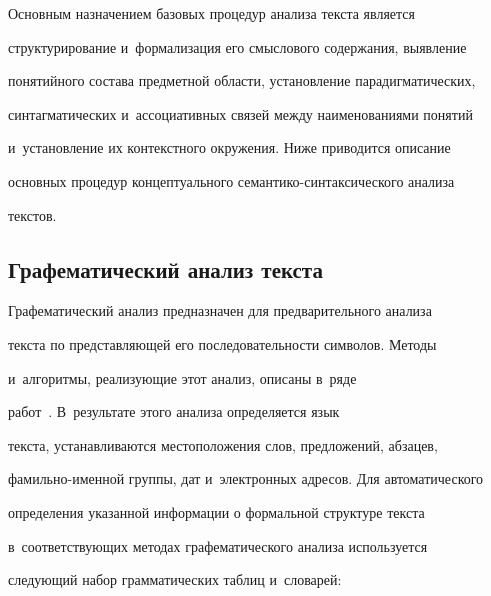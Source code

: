      Основным назначением базовых процедур анализа текста является 


структурирование и~формализация его смыслового содержания, выявление 


понятийного состава предметной области, установление парадигматических, 


синтагматических и~ассоциативных связей между наименованиями понятий 


и~установление их контекстного окружения. Ниже приводится описание 


основных процедур концептуального семантико-синтаксического анализа 


текстов.


  


\subsection{Графематический анализ текста}





  Графематический анализ предназначен для предварительного анализа 


текста по представляющей его последовательности символов. Методы 


и~алгоритмы, реализующие этот анализ, описаны в~ряде  


работ~\cite{3-kl, 2-kl, 1-kl}. В~результате этого анализа определяется язык 


текста, устанавливаются местоположения слов, предложений, абзацев, 


фамильно-именной группы, дат и~электронных адресов. Для автоматического 


определения указанной информации о формальной структуре текста 


в~соответствующих методах графематического анализа используется 


следующий набор грамматических таблиц и~словарей: 


